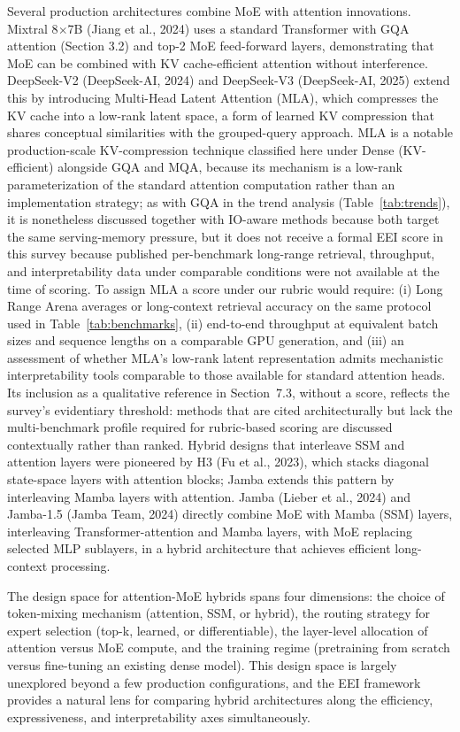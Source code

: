 \documentclass[10pt,twocolumn]{article}
\begin{document}
Several production architectures combine MoE with attention innovations. Mixtral 8$\times$7B (Jiang et al., 2024) uses a standard Transformer with GQA attention (Section 3.2) and top-2 MoE feed-forward layers, demonstrating that MoE can be combined with KV cache-efficient attention without interference. DeepSeek-V2 (DeepSeek-AI, 2024) and DeepSeek-V3 (DeepSeek-AI, 2025) extend this by introducing Multi-Head Latent Attention (MLA), which compresses the KV cache into a low-rank latent space, a form of learned KV compression that shares conceptual similarities with the grouped-query approach. MLA is a notable production-scale KV-compression technique classified here under Dense (KV-efficient) alongside GQA and MQA, because its mechanism is a low-rank parameterization of the standard attention computation rather than an implementation strategy; as with GQA in the trend analysis (Table~\ref{tab:trends}), it is nonetheless discussed together with IO-aware methods because both target the same serving-memory pressure, but it does not receive a formal EEI score in this survey because published per-benchmark long-range retrieval, throughput, and interpretability data under comparable conditions were not available at the time of scoring. To assign MLA a score under our rubric would require: (i) Long Range Arena averages or long-context retrieval accuracy on the same protocol used in Table~\ref{tab:benchmarks}, (ii) end-to-end throughput at equivalent batch sizes and sequence lengths on a comparable GPU generation, and (iii) an assessment of whether MLA's low-rank latent representation admits mechanistic interpretability tools comparable to those available for standard attention heads. Its inclusion as a qualitative reference in Section~7.3, without a score, reflects the survey's evidentiary threshold: methods that are cited architecturally but lack the multi-benchmark profile required for rubric-based scoring are discussed contextually rather than ranked. Hybrid designs that interleave SSM and attention layers were pioneered by H3 (Fu et al., 2023), which stacks diagonal state-space layers with attention blocks; Jamba extends this pattern by interleaving Mamba layers with attention. Jamba (Lieber et al., 2024) and Jamba-1.5 (Jamba Team, 2024) directly combine MoE with Mamba (SSM) layers, interleaving Transformer-attention and Mamba layers, with MoE replacing selected MLP sublayers, in a hybrid architecture that achieves efficient long-context processing.

The design space for attention-MoE hybrids spans four dimensions: the choice of token-mixing mechanism (attention, SSM, or hybrid), the routing strategy for expert selection (top-k, learned, or differentiable), the layer-level allocation of attention versus MoE compute, and the training regime (pretraining from scratch versus fine-tuning an existing dense model). This design space is largely unexplored beyond a few production configurations, and the EEI framework provides a natural lens for comparing hybrid architectures along the efficiency, expressiveness, and interpretability axes simultaneously.
\end{document}
